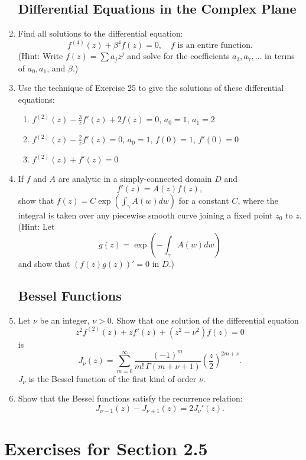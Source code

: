 \documentclass[12pt]{article}
\theoremstyle{definition} %
\theoremstyle{plain} %
\begin{document}
\begin{enumerate}
\subsection*{Differential Equations in the Complex Plane}

\item Find all solutions to the differential equation:
\[
f^{(4)}(z) + \beta^4 f(z) = 0, \quad \text{$f$ is an entire function}.
\]
(Hint: Write $f(z) = \sum a_j z^j$ and solve for the coefficients $a_3, a_7, \ldots$ in terms of $a_0, a_1$, and $\beta$.)

\item Use the technique of Exercise 25 to give the solutions of these differential equations:
\begin{enumerate}
    \item $f^{(2)}(z) - \frac{3}{z} f'(z) + 2f(z) = 0$, \quad $a_0 = 1$, $a_1 = 2$
    \item $f^{(2)}(z) - \frac{2}{z} f'(z) = 0$, \quad $a_0 = 1$, $f(0) = 1$, $f'(0) = 0$
    \item $f^{(2)}(z) + f'(z) = 0$
\end{enumerate}

\item If $f$ and $A$ are analytic in a simply-connected domain $D$ and
\[
f'(z) = A(z) f(z),
\]
show that $f(z) = C \exp\left(\int_\gamma A(w) dw\right)$ for a constant $C$, where the integral is taken over any piecewise smooth curve joining a fixed point $z_0$ to $z$. (Hint: Let
\[
g(z) = \exp\left(-\int_\gamma A(w) dw\right)
\]
and show that $(f(z) g(z))' = 0$ in $D$.)

\subsection*{Bessel Functions}

\item Let $\nu$ be an integer, $\nu > 0$. Show that one solution of the differential equation
\[
z^2 f^{(2)}(z) + z f'(z) + (z^2 - \nu^2) f(z) = 0
\]
is
\[
J_\nu(z) = \sum_{m=0}^\infty \frac{(-1)^m}{m! \, \Gamma(m + \nu + 1)} \left( \frac{z}{2} \right)^{2m + \nu}.
\]
$J_\nu$ is the Bessel function of the first kind of order $\nu$.

\item Show that the Bessel functions satisfy the recurrence relation:
\[
J_{\nu - 1}(z) - J_{\nu + 1}(z) = 2J_\nu'(z).
\]
\end{enumerate}
\section*{Exercises for Section 2.5}
\end{document}
